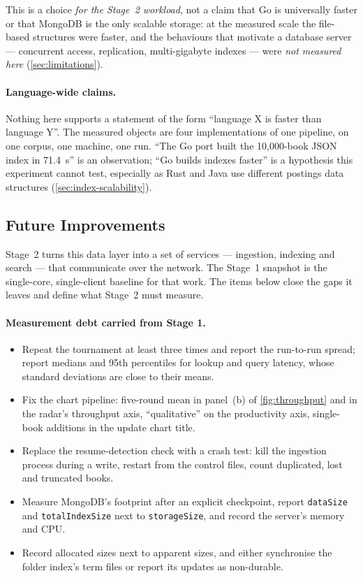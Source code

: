 This is a choice \emph{for the Stage~2 workload}, not a claim that Go is
universally faster or that MongoDB is the only scalable storage: at the
measured scale the file-based structures were faster, and the behaviours that
motivate a database server --- concurrent access, replication,
multi-gigabyte indexes --- were \emph{not measured here}
(\cref{sec:limitations}).

\paragraph{Language-wide claims.}
Nothing here supports a statement of the form ``language X is faster than
language Y''. The measured objects are four implementations of one pipeline,
on one corpus, one machine, one run. ``The Go port built the 10{,}000-book
JSON index in 71.4~s'' is an observation; ``Go builds indexes faster'' is a
hypothesis this experiment cannot test, especially as Rust and Java use
different postings data structures (\cref{sec:index-scalability}).

\subsection{Future Improvements}
\label{sec:future}

Stage~2 turns this data layer into a set of services --- ingestion, indexing
and search --- that communicate over the network. The Stage~1 snapshot is
the single-core, single-client baseline for that work. The items below close
the gaps it leaves and define what Stage~2 must measure.

\paragraph{Measurement debt carried from Stage 1.}
\begin{itemize}
    \item Repeat the tournament at least three times and report the
    run-to-run spread; report medians and 95th percentiles for lookup and
    query latency, whose standard deviations are close to their means.
    \item Fix the chart pipeline: five-round mean in panel~(b) of
    \cref{fig:throughput} and in the radar's throughput axis,
    ``qualitative'' on the productivity axis, single-book additions in the
    update chart title.
    \item Replace the resume-detection check with a crash test: kill the
    ingestion process during a write, restart from the control files, count
    duplicated, lost and truncated books.
    \item Measure MongoDB's footprint after an explicit checkpoint, report
    \texttt{dataSize} and \texttt{totalIndexSize} next to
    \texttt{storageSize}, and record the server's memory and CPU.
    \item Record allocated sizes next to apparent sizes, and either
    synchronise the folder index's term files or report its updates as
    non-durable.
\end{itemize}


